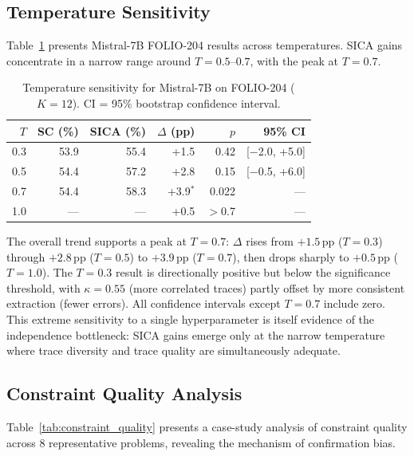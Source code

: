 \documentclass[11pt,a4paper]{article}
\begin{document}
\subsection{Temperature Sensitivity}
\label{sec:sensitivity}

Table~\ref{tab:tsens} presents Mistral-7B FOLIO-204 results across temperatures. SICA gains concentrate in a narrow range around $T=0.5$--$0.7$, with the peak at $T=0.7$.

\begin{table}[t]
\centering
\caption{Temperature sensitivity for Mistral-7B on FOLIO-204 ($K=12$). CI = 95\% bootstrap confidence interval.}
\label{tab:tsens}
\small
\begin{tabular}{rrrrrr}
\toprule
$T$ & SC (\%) & SICA (\%) & $\Delta$ (pp) & $p$ & 95\% CI \\
\midrule
0.3 & 53.9 & 55.4 & +1.5 & 0.42 & [$-$2.0, +5.0] \\
0.5 & 54.4 & 57.2 & +2.8 & 0.15 & [$-$0.5, +6.0] \\
0.7 & 54.4 & 58.3 & +3.9$^*$ & 0.022 & --- \\
1.0 & --- & --- & +0.5 & $>$0.7 & --- \\
\bottomrule
\end{tabular}
\end{table}

The overall trend supports a peak at $T=0.7$: $\Delta$ rises from $+1.5$\,pp ($T=0.3$) through $+2.8$\,pp ($T=0.5$) to $+3.9$\,pp ($T=0.7$), then drops sharply to $+0.5$\,pp ($T=1.0$). The $T=0.3$ result is directionally positive but below the significance threshold, with $\kappa = 0.55$ (more correlated traces) partly offset by more consistent extraction (fewer errors). All confidence intervals except $T=0.7$ include zero. This extreme sensitivity to a single hyperparameter is itself evidence of the independence bottleneck: SICA gains emerge only at the narrow temperature where trace diversity and trace quality are simultaneously adequate.


\subsection{Constraint Quality Analysis}
\label{sec:quality}

Table~\ref{tab:constraint_quality} presents a case-study analysis of constraint quality across 8 representative problems, revealing the mechanism of confirmation bias.
\end{document}
